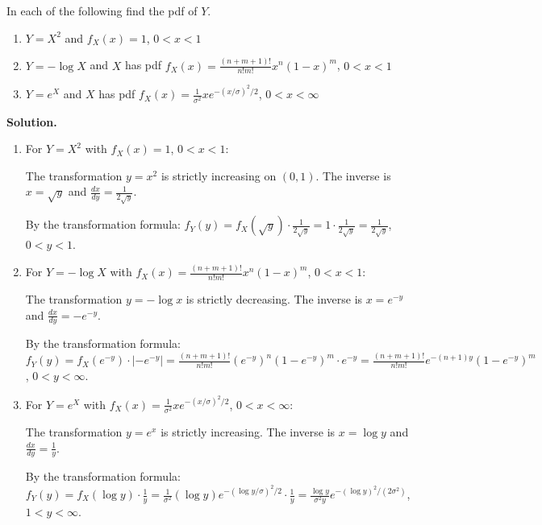 \begin{problembox}
In each of the following find the pdf of $Y$.
\begin{enumerate}[label=(\alph*)]
    \item $Y = X^2$ and $f_X(x) = 1$, $0 < x < 1$
    \item $Y = -\log X$ and $X$ has pdf $f_X(x) = \frac{(n+m+1)!}{n!m!} x^n(1-x)^m$, $0 < x < 1$
    \item $Y = e^X$ and $X$ has pdf $f_X(x) = \frac{1}{\sigma^2} xe^{-(x/\sigma)^2/2}$, $0 < x < \infty$
\end{enumerate}
\end{problembox}

\noindent\textbf{Solution.}
\begin{enumerate}[label=(\alph*)]
    \item For $Y = X^2$ with $f_X(x) = 1$, $0 < x < 1$:
    
    The transformation $y = x^2$ is strictly increasing on $(0,1)$. The inverse is $x = \sqrt{y}$ and $\frac{dx}{dy} = \frac{1}{2\sqrt{y}}$.
    
    By the transformation formula: $f_Y(y) = f_X(\sqrt{y}) \cdot \frac{1}{2\sqrt{y}} = 1 \cdot \frac{1}{2\sqrt{y}} = \frac{1}{2\sqrt{y}}$, $0 < y < 1$.
    
    \item For $Y = -\log X$ with $f_X(x) = \frac{(n+m+1)!}{n!m!} x^n(1-x)^m$, $0 < x < 1$:
    
    The transformation $y = -\log x$ is strictly decreasing. The inverse is $x = e^{-y}$ and $\frac{dx}{dy} = -e^{-y}$.
    
    By the transformation formula: $f_Y(y) = f_X(e^{-y}) \cdot |-e^{-y}| = \frac{(n+m+1)!}{n!m!} (e^{-y})^n(1-e^{-y})^m \cdot e^{-y} = \frac{(n+m+1)!}{n!m!} e^{-(n+1)y}(1-e^{-y})^m$, $0 < y < \infty$.
    
    \item For $Y = e^X$ with $f_X(x) = \frac{1}{\sigma^2} xe^{-(x/\sigma)^2/2}$, $0 < x < \infty$:
    
    The transformation $y = e^x$ is strictly increasing. The inverse is $x = \log y$ and $\frac{dx}{dy} = \frac{1}{y}$.
    
    By the transformation formula: $f_Y(y) = f_X(\log y) \cdot \frac{1}{y} = \frac{1}{\sigma^2} (\log y) e^{-(\log y/\sigma)^2/2} \cdot \frac{1}{y} = \frac{\log y}{\sigma^2 y} e^{-(\log y)^2/(2\sigma^2)}$, $1 < y < \infty$.
\end{enumerate}


